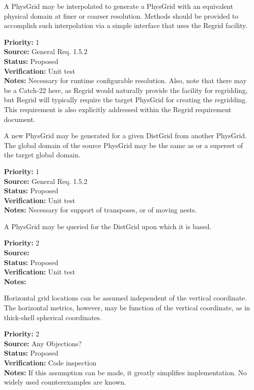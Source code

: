 A PhysGrid may be interpolated to generate a PhysGrid with an equivalent physical
domain at finer or coarser resolution.  Methods should be provided to accomplish such
interpolation via a simple interface that uses the Regrid facility.
\begin{reqlist}
{\bf Priority:} 1 \\
{\bf Source:} General Req. 1.5.2 \\
{\bf Status:} Proposed \\
{\bf Verification:} Unit test\\
{\bf Notes:} Necessary for runtime configurable resolution.  Also, note that 
there may be a Catch-22 here, as Regrid would naturally provide the facility
for regridding, but Regrid will typically require the target PhysGrid for
creating the regridding.  This requirement is also explicitly addressed within the
Regrid requirement document.
\end{reqlist}

A new PhysGrid may be generated for a given DistGrid from another PhysGrid.
The global domain of the source PhysGrid may be the same as or a superset of
the target global domain.
\begin{reqlist}
{\bf Priority:} 1 \\
{\bf Source:} General Req. 1.5.2 \\
{\bf Status:} Proposed \\
{\bf Verification:} Unit test\\
{\bf Notes:} Necessary for support of transposes, or of moving nests.
\end{reqlist}

A PhysGrid may be queried for the DistGrid upon which it is based.
\begin{reqlist}
{\bf Priority:} 2 \\
{\bf Source:} \\
{\bf Status:} Proposed \\
{\bf Verification:} Unit test \\
{\bf Notes:} 
\end{reqlist}

Horizontal grid locations can be assumed independent of the vertical coordinate.
The horizontal metrics, however, may be function of the vertical coordinate, as
in thick-shell spherical coordinates.
\begin{reqlist}
{\bf Priority:} 2 \\
{\bf Source:} Any Objections? \\
{\bf Status:} Proposed \\
{\bf Verification:} Code inspection\\
{\bf Notes:} If this assumption can be made, it greatly simplifies implementation.
No widely used counterexamples are known.
\end{reqlist}

